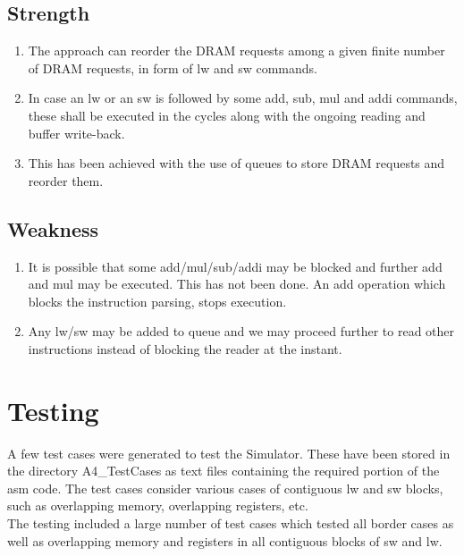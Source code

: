 \documentclass{article} %
\begin{document}
\subsection{Strength}
\begin{enumerate}
    \item The approach can reorder the DRAM requests among a given finite number of DRAM requests, in form of lw and sw commands.
    \item In case an lw or an sw is followed by some add, sub, mul and addi commands, these shall be executed in the cycles along with the ongoing reading and buffer write-back.
    \item This has been achieved with the use of queues to store DRAM requests and reorder them.
\end{enumerate}
\subsection{Weakness}
\begin{enumerate}
    \item It is possible that some add/mul/sub/addi may be blocked and further add and mul may be executed. This has not been done. An add operation which blocks the instruction parsing, stops execution.
    \item Any lw/sw may be added to queue and we may proceed further to read other instructions instead of blocking the reader at the instant.
\end{enumerate}

\section{Testing}
A few test cases were generated to test the Simulator. These have been stored in the directory A4\_TestCases as text files containing the required portion of the asm code. The test cases consider various cases of contiguous lw and sw blocks, such as overlapping memory, overlapping registers, etc.
\\The testing included a large number of test cases which tested all border cases as well as overlapping memory and registers in all contiguous blocks of sw and lw.
\end{document}
